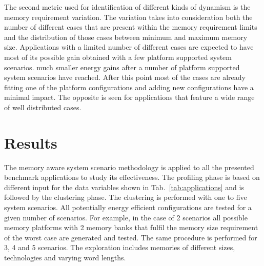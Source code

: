 \documentclass{acm_proc_article-sp}
\begin{document}
The second metric used for identification of different kinds of dynamism is the memory requirement variation. The variation takes into consideration both the number of different cases that are present within the memory requirement limits and the distribution of those cases between minimum and maximum memory size. Applications with a limited number of different cases are expected to have most of its possible gain obtained with a few platform supported system scenarios. much smaller energy gains after a number of platform supported system scenarios have reached. After this point most of the cases are already fitting one of the platform configurations and adding new configurations have a minimal impact. The opposite is seen for applications that feature a wide range of well distributed cases.

\section{Results}
\label{sec:results}

The memory aware system scenario methodology is applied to all the presented benchmark applications to study its effectiveness. The profiling phase is based on different input for the data variables shown in Tab.~\ref{tab:applications} and is followed by the clustering phase. The clustering is performed with one to five system scenarios. All potentially energy efficient configurations are tested for a given number of scenarios. For example, in the case of 2 scenarios all possible memory platforms with 2 memory banks that fulfil the memory size requirement of the worst case are generated and tested. The same procedure is performed for 3, 4 and 5 scenarios. The exploration includes memories of different sizes, technologies and varying word lengths. 
\end{document}
